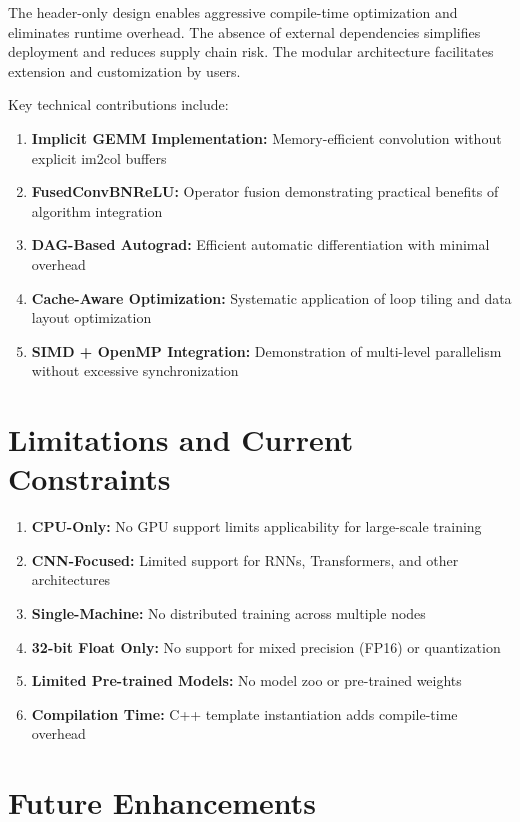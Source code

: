 \documentclass[12pt,oneside,a4paper]{report}
\begin{document}
The header-only design enables aggressive compile-time optimization and eliminates runtime overhead. The absence of external dependencies simplifies deployment and reduces supply chain risk. The modular architecture facilitates extension and customization by users.

Key technical contributions include:

\begin{enumerate}
    \item \textbf{Implicit GEMM Implementation:} Memory-efficient convolution without explicit im2col buffers
    \item \textbf{FusedConvBNReLU:} Operator fusion demonstrating practical benefits of algorithm integration
    \item \textbf{DAG-Based Autograd:} Efficient automatic differentiation with minimal overhead
    \item \textbf{Cache-Aware Optimization:} Systematic application of loop tiling and data layout optimization
    \item \textbf{SIMD + OpenMP Integration:} Demonstration of multi-level parallelism without excessive synchronization
\end{enumerate}

\section{Limitations and Current Constraints}

\begin{enumerate}
    \item \textbf{CPU-Only:} No GPU support limits applicability for large-scale training
    \item \textbf{CNN-Focused:} Limited support for RNNs, Transformers, and other architectures
    \item \textbf{Single-Machine:} No distributed training across multiple nodes
    \item \textbf{32-bit Float Only:} No support for mixed precision (FP16) or quantization
    \item \textbf{Limited Pre-trained Models:} No model zoo or pre-trained weights
    \item \textbf{Compilation Time:} C++ template instantiation adds compile-time overhead
\end{enumerate}

\section{Future Enhancements}
\end{document}
